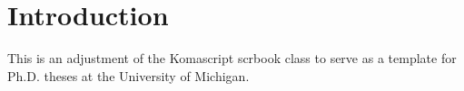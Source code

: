 
\chapter{Introduction}

This is an adjustment of the Komascript scrbook class to serve as a template for Ph.D. theses at the University of Michigan.